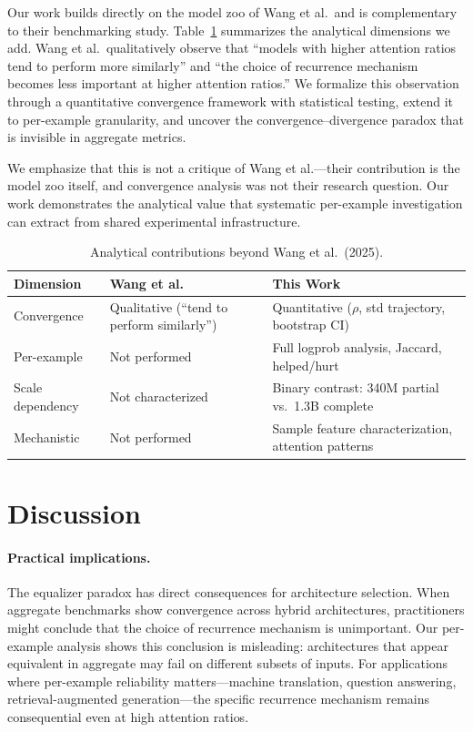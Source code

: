 \documentclass[11pt,a4paper]{article}
\begin{document}
Our work builds directly on the model zoo of Wang et al.\ and is complementary to their benchmarking study. Table~\ref{tab:differentiation} summarizes the analytical dimensions we add. Wang et al.\ qualitatively observe that ``models with higher attention ratios tend to perform more similarly'' and ``the choice of recurrence mechanism becomes less important at higher attention ratios.'' We formalize this observation through a quantitative convergence framework with statistical testing, extend it to per-example granularity, and uncover the convergence--divergence paradox that is invisible in aggregate metrics.

We emphasize that this is not a critique of Wang et al.---their contribution is the model zoo itself, and convergence analysis was not their research question. Our work demonstrates the analytical value that systematic per-example investigation can extract from shared experimental infrastructure.

\begin{table}[t]
\centering
\small
\caption{Analytical contributions beyond Wang et al.\ (2025).}
\label{tab:differentiation}
\begin{tabular}{@{}p{3cm}p{4.2cm}p{4.8cm}@{}}
\toprule
Dimension & Wang et al. & This Work \\
\midrule
Convergence & Qualitative (``tend to perform similarly'') & Quantitative ($\rho$, std trajectory, bootstrap CI) \\
Per-example & Not performed & Full logprob analysis, Jaccard, helped/hurt \\
Scale dependency & Not characterized & Binary contrast: 340M partial vs.\ 1.3B complete \\
Mechanistic & Not performed & Sample feature characterization, attention patterns \\
\bottomrule
\end{tabular}
\end{table}

\section{Discussion}

\paragraph{Practical implications.}
The equalizer paradox has direct consequences for architecture selection. When aggregate benchmarks show convergence across hybrid architectures, practitioners might conclude that the choice of recurrence mechanism is unimportant. Our per-example analysis shows this conclusion is misleading: architectures that appear equivalent in aggregate may fail on different subsets of inputs. For applications where per-example reliability matters---machine translation, question answering, retrieval-augmented generation---the specific recurrence mechanism remains consequential even at high attention ratios.
\end{document}
